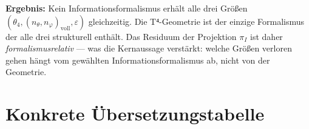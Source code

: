 \begin{center}
\renewcommand{\arraystretch}{1.3}
{\footnotesize
{}
}
\end{center}

\textbf{Ergebnis:} Kein Informationsformalismus erhält alle drei Größen
$(\theta_4, (n_\theta,n_\varphi)_\text{voll}, \varepsilon)$ gleichzeitig.
Die T⁴-Geometrie ist der einzige Formalismus der alle drei strukturell
enthält. Das Residuum der Projektion $\pi_I$ ist daher \emph{formalismus\-relativ}
--- was die Kernaussage verstärkt: welche Größen verloren gehen hängt
vom gewählten Informationsformalismus ab, nicht von der Geometrie.

\section{Konkrete Übersetzungstabelle}

